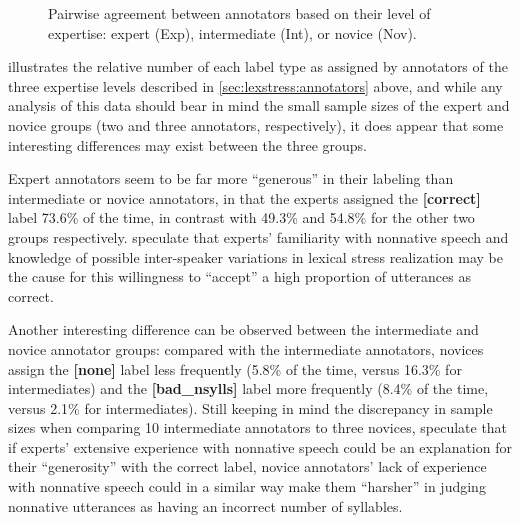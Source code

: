 \begin{figure}[phtb]
			\caption[Pairwise agreement statistics by annotator expertise]{Pairwise agreement between annotators based on their level of expertise: expert (Exp), intermediate (Int), or novice (Nov). 
			}
			\label{fig:agreement:expertise}
		\end{figure}
		
			 illustrates the relative number of each label type as assigned by annotators of the three expertise levels described in \cref{sec:lexstress:annotators} above, and while any analysis of this data should bear in mind the small sample sizes of the expert and novice groups (two and three annotators, respectively), it does appear that some interesting differences may exist between the three groups. 
			
			Expert annotators seem to be far more ``generous'' in their labeling than intermediate or novice annotators, in that the experts assigned the \textbf{[correct]} label 73.6\% of the time, in contrast with 49.3\% and 54.8\% for the other two groups respectively.  speculate that experts' familiarity with nonnative speech and knowledge of possible inter-speaker variations in lexical stress realization may be the cause for this willingness to ``accept'' a high proportion of utterances as correct. 
			
			Another interesting difference can be observed between the intermediate and novice annotator groups: compared with the intermediate annotators, novices assign the \textbf{[none]} label less frequently (5.8\% of the time, versus 16.3\% for intermediates) and the \textbf{[bad\_nsylls]} label more frequently (8.4\% of the time, versus 2.1\% for intermediates). Still keeping in mind the discrepancy in sample sizes when comparing 10 intermediate annotators to three novices,  speculate that if experts' extensive experience with nonnative speech could be an explanation for their ``generosity'' with the correct label, novice annotators' lack of experience with nonnative speech could in a similar way make them ``harsher'' in judging nonnative utterances as having an incorrect number of syllables. %
			
